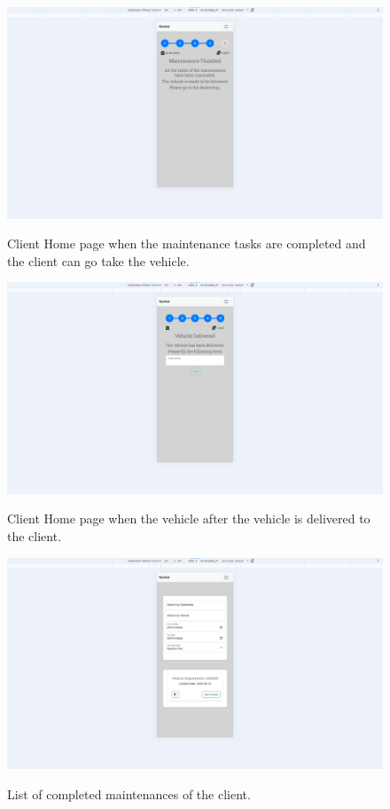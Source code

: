 \begin{figure}[h]
  \caption{Client Home page when the maintenance tasks are completed and the client can go take the vehicle.}
  \centering
  \includegraphics[width=\textwidth]{figs/Implementation/client/MaintenanceState4}
  \label{fig:MaintenanceState4}
\end{figure}


\begin{figure}[h]
  \caption{Client Home page when the vehicle after the vehicle is delivered to the client.}
  \centering
  \includegraphics[width=\textwidth]{figs/Implementation/client/MaintenanceState5}
  \label{fig:MaintenanceState5}
\end{figure}

\begin{figure}[h]
  \caption{List of completed maintenances of the client.}
  \centering
  \includegraphics[width=\textwidth]{figs/Implementation/client/MaintenanceHistory}
  \label{fig:clientMaintenanceHistory}
\end{figure}


